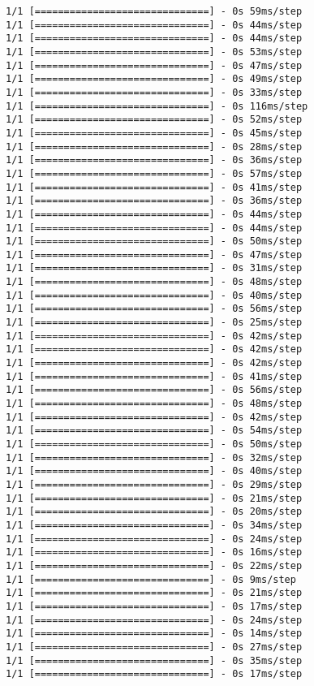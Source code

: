 \documentclass[11pt]{article}
\begin{document}
\begin{Verbatim}[commandchars=\\\{\}]
1/1 [==============================] - 0s 59ms/step
1/1 [==============================] - 0s 44ms/step
1/1 [==============================] - 0s 44ms/step
1/1 [==============================] - 0s 53ms/step
1/1 [==============================] - 0s 47ms/step
1/1 [==============================] - 0s 49ms/step
1/1 [==============================] - 0s 33ms/step
1/1 [==============================] - 0s 116ms/step
1/1 [==============================] - 0s 52ms/step
1/1 [==============================] - 0s 45ms/step
1/1 [==============================] - 0s 28ms/step
1/1 [==============================] - 0s 36ms/step
1/1 [==============================] - 0s 57ms/step
1/1 [==============================] - 0s 41ms/step
1/1 [==============================] - 0s 36ms/step
1/1 [==============================] - 0s 44ms/step
1/1 [==============================] - 0s 44ms/step
1/1 [==============================] - 0s 50ms/step
1/1 [==============================] - 0s 47ms/step
1/1 [==============================] - 0s 31ms/step
1/1 [==============================] - 0s 48ms/step
1/1 [==============================] - 0s 40ms/step
1/1 [==============================] - 0s 56ms/step
1/1 [==============================] - 0s 25ms/step
1/1 [==============================] - 0s 42ms/step
1/1 [==============================] - 0s 42ms/step
1/1 [==============================] - 0s 42ms/step
1/1 [==============================] - 0s 41ms/step
1/1 [==============================] - 0s 56ms/step
1/1 [==============================] - 0s 48ms/step
1/1 [==============================] - 0s 42ms/step
1/1 [==============================] - 0s 54ms/step
1/1 [==============================] - 0s 50ms/step
1/1 [==============================] - 0s 32ms/step
1/1 [==============================] - 0s 40ms/step
1/1 [==============================] - 0s 29ms/step
1/1 [==============================] - 0s 21ms/step
1/1 [==============================] - 0s 20ms/step
1/1 [==============================] - 0s 34ms/step
1/1 [==============================] - 0s 24ms/step
1/1 [==============================] - 0s 16ms/step
1/1 [==============================] - 0s 22ms/step
1/1 [==============================] - 0s 9ms/step
1/1 [==============================] - 0s 21ms/step
1/1 [==============================] - 0s 17ms/step
1/1 [==============================] - 0s 24ms/step
1/1 [==============================] - 0s 14ms/step
1/1 [==============================] - 0s 27ms/step
1/1 [==============================] - 0s 35ms/step
1/1 [==============================] - 0s 17ms/step

\end{Verbatim}
\end{document}
